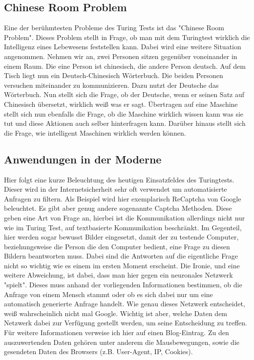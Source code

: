 \subsection{Chinese Room Problem}
Eine der berühmtesten Probleme des Turing Tests ist das "Chinese Room Problem". Dieses Problem stellt in Frage, ob man mit dem Turingtest wirklich die Intelligenz eines Lebewesens feststellen kann. Dabei wird eine weitere Situation angenommen. Nehmen wir an, zwei Personen sitzen gegenüber voneinander in einem Raum. Die eine Person ist chinesisch, die andere Person deutsch. Auf dem Tisch liegt nun ein Deutsch-Chinesisch Wörterbuch. Die beiden Personen versuchen miteinander zu kommunizieren. Dazu nutzt der Deutsche das Wörterbuch. Nun stellt sich die Frage, ob der Deutsche, wenn er seinen Satz auf Chinesisch übersetzt, wirklich weiß was er sagt. Übertragen auf eine Maschine stellt sich nun ebenfalls die Frage, ob die Maschine wirklich wissen kann was sie tut und diese Aktionen auch selber hinterfragen kann. Darüber hinaus stellt sich die Frage, wie intelligent Maschinen wirklich werden können.
\subsection{Anwendungen in der Moderne}
Hier folgt eine kurze Beleuchtung des heutigen Einsatzfeldes des Turingtests. Dieser wird in der Internetsicherheit sehr oft verwendet um automatisierte Anfragen zu filtern. Als Beispiel wird hier exemplarisch ReCaptcha von Google beleuchtet. Es gibt aber genug andere sogenannte Captcha Methoden. Diese geben eine Art von Frage an, hierbei ist die Kommunikation allerdings nicht nur wie im Turing Test, auf textbasierte Kommunikation beschränkt. Im Gegenteil, hier werden sogar bewusst Bilder eingesetzt, damit der zu testende Computer, beziehungsweise die Person die den Computer bedient, eine Frage zu diesen Bildern beantworten muss. Dabei sind die Antworten auf die eigentliche Frage nicht so wichtig wie es einem im ersten Moment erscheint. Die Ironie, und eine weitere Abweichung, ist dabei, dass man hier gegen ein neuronales Netzwerk "spielt". Dieses muss anhand der vorliegenden Informationen bestimmen, ob die Anfrage von einem Mensch stammt oder ob es sich dabei nur um eine automatisch generierte Anfrage handelt. Wie genau dieses Netzwerk entscheidet, weiß wahrscheinlich nicht mal Google. Wichtig ist aber, welche Daten dem Netzwerk dabei zur Verfügung gestellt werden, um seine Entscheidung zu treffen. Für weitere Informationen verweise ich hier auf einen Blog-Eintrag\cite{captcha}. Zu den auszuwertenden Daten gehören unter anderem die Mausbewegungen, sowie die gesendeten Daten des Browsers (z.B. User-Agent, IP, Cookies).
